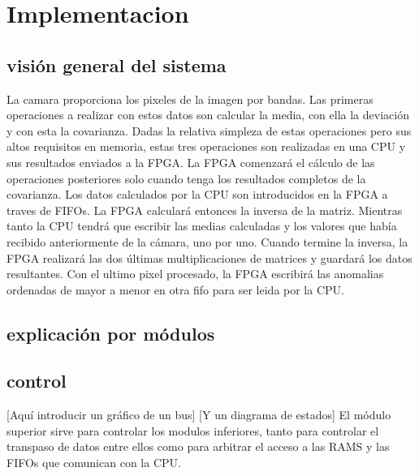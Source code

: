 
\cleardoublepage

\chapter{Implementacion}
\label{makereference}

\section{visión general del sistema}
La camara proporciona los pixeles de la imagen por bandas. Las primeras operaciones a realizar con estos datos son calcular la media, con ella la deviación y con esta la covarianza. Dadas la relativa simpleza de estas operaciones pero sus altos requisitos en memoria, estas tres operaciones son realizadas en una CPU y sus resultados enviados a la FPGA. La FPGA comenzará el cálculo de las operaciones posteriores solo cuando tenga los resultados completos de la covarianza.
Los datos calculados por la CPU son introducidos en la FPGA a traves de FIFOs.
La FPGA calculará entonces la inversa de la matriz. Mientras tanto la CPU tendrá que escribir las medias calculadas y los valores que había recibido anteriormente de la cámara, uno por uno. Cuando termine la inversa, la FPGA realizará las dos últimas multiplicaciones de matrices y guardará los datos resultantes. Con el ultimo pixel procesado, la FPGA escribirá las anomalias ordenadas de mayor a menor en otra fifo para ser leida por la CPU.

\section{explicación por módulos}
\section{control}
[Aquí introducir un gráfico de un bus]
[Y un diagrama de estados]
El módulo superior sirve para controlar los modulos inferiores, tanto para controlar el transpaso de datos entre ellos como para arbitrar el acceso a las RAMS y las FIFOs que comunican con la CPU.

